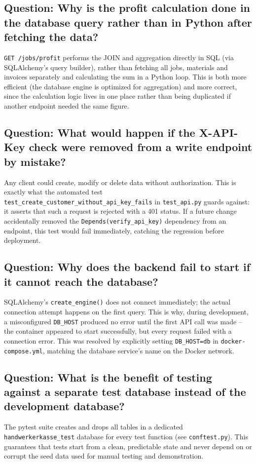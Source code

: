 \documentclass[11pt,a4paper]{article}
\begin{document}
\subsection*{Question: Why is the profit calculation done in the database query rather than in Python after fetching the data?}

\texttt{GET /jobs/profit} performs the JOIN and aggregation directly in SQL (via SQLAlchemy's query builder), rather than fetching all jobs, materials and invoices separately and calculating the sum in a Python loop. This is both more efficient (the database engine is optimized for aggregation) and more correct, since the calculation logic lives in one place rather than being duplicated if another endpoint needed the same figure.

\subsection*{Question: What would happen if the X-API-Key check were removed from a write endpoint by mistake?}

Any client could create, modify or delete data without authorization. This is exactly what the automated test \texttt{test\_create\_customer\_without\_api\_key\_fails} in \texttt{test\_api.py} guards against: it asserts that such a request is rejected with a 401 status. If a future change accidentally removed the \texttt{Depends(verify\_api\_key)} dependency from an endpoint, this test would fail immediately, catching the regression before deployment.

\subsection*{Question: Why does the backend fail to start if it cannot reach the database?}

SQLAlchemy's \texttt{create\_engine()} does not connect immediately; the actual connection attempt happens on the first query. This is why, during development, a misconfigured \texttt{DB\_HOST} produced no error until the first API call was made -- the container appeared to start successfully, but every request failed with a connection error. This was resolved by explicitly setting \texttt{DB\_HOST=db} in \texttt{docker-compose.yml}, matching the database service's name on the Docker network.

\subsection*{Question: What is the benefit of testing against a separate test database instead of the development database?}

The pytest suite creates and drops all tables in a dedicated \texttt{handwerkerkasse\_test} database for every test function (see \texttt{conftest.py}). This guarantees that tests start from a clean, predictable state and never depend on or corrupt the seed data used for manual testing and demonstration.
\end{document}
